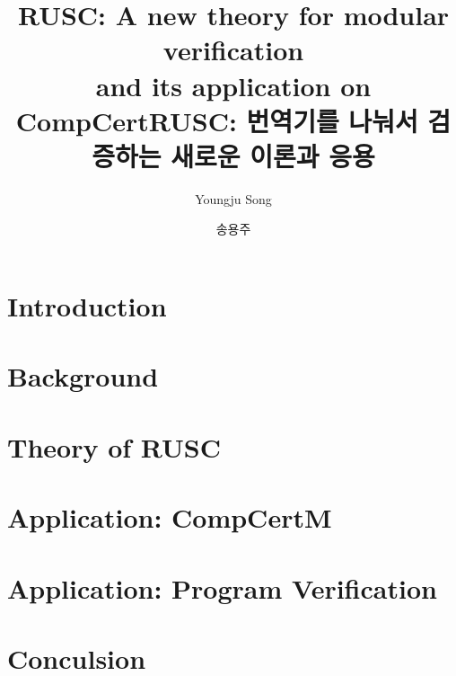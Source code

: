 \documentclass[oneside,phd]{snuthesis}
\title{RUSC: A new theory for modular verification\\ and its application on CompCert}
\title*{RUSC: 번역기를 나눠서 검증하는 새로운 이론과 응용}
\author{Youngju Song}
\author*{송용주} %
\begin{document}
\makefrontcover
\makefrontcover
\makeapproval

\cleardoublepage
{}





\tableofcontents
\listoffigures
\listoftables

\cleardoublepage
{}

\chapter{\;\;\;Introduction}
\label{chap:intro}


\chapter{\;\;\;Background}
\label{chap:background}


\chapter{\;\;\;Theory of RUSC}
\label{chap:rusc}


\chapter{\;\;\;Application: CompCertM}
\label{chap:compiler}


\chapter{\;\;\;Application: Program Verification}
\label{chap:program}


\chapter{\;\;\;Conculsion}
\label{chap:concl}







\end{document}

